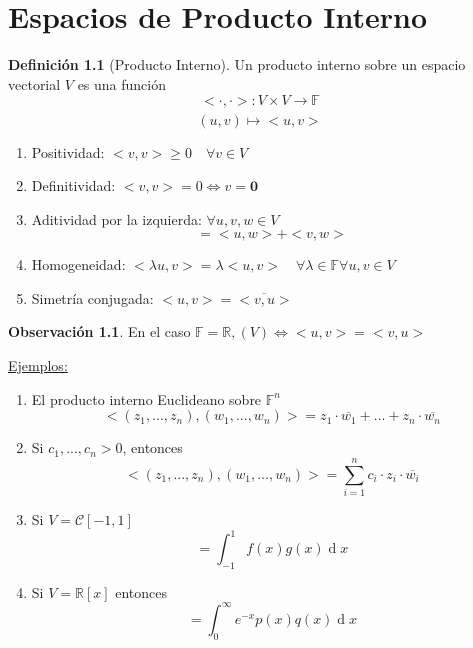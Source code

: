 \documentclass[11pt]{book}
\renewcommand{\d}[1]{\ensuremath{\operatorname{d}\!{#1}}}
\renewcommand{\vec}[1]{\mathbf{#1}}
\newcommand{\set}[1]{\mathbb{#1}}
\newcommand{\func}[5]{#1:#2\xrightarrow[#5]{#4}#3}
\theoremstyle{definition}
\newtheorem{defn}{Definición}[section]
\newtheorem{obs}{Observación}[section]
\begin{document}
\chapter{Espacios de Producto Interno}
\begin{defn}[Producto Interno]
	Un producto interno sobre un espacio vectorial $V$ es una función
	\[\func{<\cdot,\cdot>}{V\times V}{\set{F}}{}{}\]
	\[(u,v)\mapsto <u,v>\]
	\begin{enumerate}[label=\roman*)]
		\item Positividad: $<v,v>\geq 0\quad\forall v\in V$

		\item Definitividad: $<v,v>=0\iff v=\vec{0}$

		\item Aditividad por la izquierda: $\forall u,v,w\in V$
		      \[<u+v,w>=<u,w>+<v,w>\]

		\item Homogeneidad: $<\lambda u,v>=\lambda<u,v>\quad\forall\lambda\in\set{F}\forall u,v\in V$

		\item Simetría conjugada: $<u,v>=\overline{<v,u>}$
	\end{enumerate}
\end{defn}
\begin{obs}
	En el caso $\set{F}=\set{R}, (V)\iff <u,v>=<v,u>$
\end{obs}
\underline{Ejemplos:}
\begin{enumerate}[label=\alph*)]
	\item El producto interno Euclideano sobre $\set{F}^n$
	      \[<(z_1,...,z_n),(w_1,...,w_n)>=z_1\cdot \overline{w_1}+...+z_n\cdot \overline{w_n}\]

	\item Si $c_1,...,c_n>0$, entonces
	      \[<(z_1,...,z_n),(w_1,...,w_n)>=\sum^n_{i=1}c_i\cdot z_i\cdot \overline{w_i}\]

	\item Si $V=\mathcal{C}[-1,1]$
	      \[<f,g>=\int^1_{-1}f(x)g(x)\d x\]

	\item Si $V=\set{R}[x]$ entonces
	      \[<p,q>=\int_0^\infty e^{-x} p(x)q(x)\d{x}\]
\end{enumerate}
\end{document}
